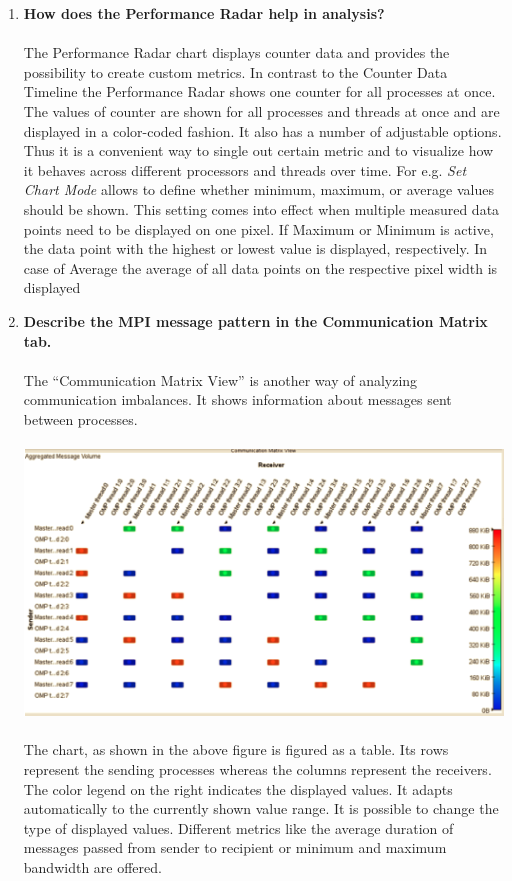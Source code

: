 \documentclass[10pt, letterpaper, twoside]{article}
\begin{document}
\begin{titlepage}
\begin{enumerate}
\item \textbf{How does the Performance Radar help in analysis?} \\ \\
The Performance Radar chart displays counter data and provides the possibility to create custom metrics. In contrast to the Counter Data Timeline the Performance Radar shows one counter for all processes at once. The values of counter are shown for all processes and threads at once and are displayed in a color-coded fashion. It also has a number of adjustable options. Thus it is a convenient way to single out certain metric and to visualize how it behaves across different processors and threads over time. For e.g. \textit{Set Chart Mode} allows to define whether minimum, maximum, or average values should be shown. This setting comes into effect when multiple measured data points need to be displayed on one pixel. If Maximum or Minimum is active, the data point with the highest or lowest value is displayed, respectively. In case of Average the average of all data points on the respective pixel width is displayed


\item \textbf{Describe the MPI message pattern in the Communication Matrix tab.} \\ \\
The “Communication Matrix View” is another way of analyzing communication imbalances. It shows information about messages sent between processes. \\ \\
\includegraphics[scale = 0.5]{communication.png} \\ \\
The chart, as shown in the above figure is figured as a table. Its rows represent the sending processes whereas the columns represent the receivers. The color legend on the right indicates the displayed values. It adapts automatically to the currently shown value range. It is possible to change the type of displayed values. Different metrics like the average duration of messages passed from sender to recipient or minimum and maximum bandwidth are offered. 


\end{enumerate}
\end{titlepage}
\end{document}
